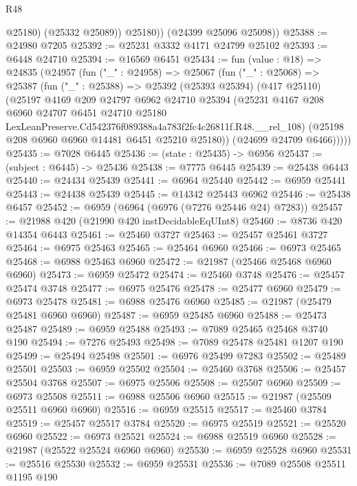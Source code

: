 \begin{lexlean}{R48}
\begin{coremodule}
              @25180)
            (@25332 @25089))
          @25180))
      (@24399 @25096 @25098))
@25388 := @24980 @7205
@25392 := @25231 @3332 @4171 @24799 @25102
@25393 := @6448 @24710
@25394 := @16569 @6451
@25434 := fun (value : @18) =>
  @24835
    (@24957
      (fun ("_" : @24958) =>
      @25067
        (fun ("_" : @25068) =>
        @25387
          (fun ("_" : @25388) =>
          @25392
            (@25393 @25394)
            (@417 @25110)
            (@25197
              @4169
              @209
              @24797
              @6962
              @24710
              @25394
              (@25231
                @4167
                @208
                @6960
                @24707
                @6451
                @24710
                @25180
                LexLeanPreserve.Cd542376f089388a4a783f2fc4c26811f.R48.__rel_108)
              (@25198 @208 @6960 @6960 @14481 @6451 @25210 @25180))
            (@24699 @24709 @6466)))))
@25435 := @7028 @6445
@25436 := (state : @25435) -> @6956
@25437 := (subject : @6445) -> @25436
@25438 := @7775 @6445
@25439 := @25438 @6443
@25440 := @24434 @25439
@25441 := @6964 @25440
@25442 := @6959 @25441
@25443 := @24438 @25439
@25445 := @14342 @25443 @6962
@25446 := @25438 @6457
@25452 := @6959 (@6964 (@6976 (@7276 @25446 @24) @7283))
@25457 := @21988 @420 (@21990 @420 instDecidableEqUInt8)
@25460 := @8736 @420 @14354 @6443
@25461 := @25460 @3727
@25463 := @25457 @25461 @3727
@25464 := @6975 @25463
@25465 := @25464 @6960
@25466 := @6973 @25465
@25468 := @6988 @25463 @6960
@25472 := @21987 (@25466 @25468 @6960 @6960)
@25473 := @6959 @25472
@25474 := @25460 @3748
@25476 := @25457 @25474 @3748
@25477 := @6975 @25476
@25478 := @25477 @6960
@25479 := @6973 @25478
@25481 := @6988 @25476 @6960
@25485 := @21987 (@25479 @25481 @6960 @6960)
@25487 := @6959 @25485 @6960
@25488 := @25473 @25487
@25489 := @6959 @25488
@25493 := @7089 @25465 @25468 @3740 @190
@25494 := @7276 @25493
@25498 := @7089 @25478 @25481 @1207 @190
@25499 := @25494 @25498
@25501 := @6976 @25499 @7283
@25502 := @25489 @25501
@25503 := @6959 @25502
@25504 := @25460 @3768
@25506 := @25457 @25504 @3768
@25507 := @6975 @25506
@25508 := @25507 @6960
@25509 := @6973 @25508
@25511 := @6988 @25506 @6960
@25515 := @21987 (@25509 @25511 @6960 @6960)
@25516 := @6959 @25515
@25517 := @25460 @3784
@25519 := @25457 @25517 @3784
@25520 := @6975 @25519
@25521 := @25520 @6960
@25522 := @6973 @25521
@25524 := @6988 @25519 @6960
@25528 := @21987 (@25522 @25524 @6960 @6960)
@25530 := @6959 @25528 @6960
@25531 := @25516 @25530
@25532 := @6959 @25531
@25536 := @7089 @25508 @25511 @1195 @190

\end{coremodule}
\end{lexlean}
